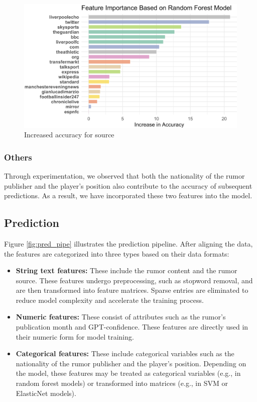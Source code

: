 \begin{figure}[ht]
    \centering
    \includegraphics[width=.8\textwidth]{figs/source_acc.png}
    \caption{
       Increased accuracy for source
    }\label{fig:source_acc}
\end{figure}



\subsubsection{Others}

Through experimentation, we observed that both the nationality of the rumor publisher and the player’s position also contribute to the accuracy of subsequent predictions. As a result, we have incorporated these two features into the model.


\subsection{Prediction}

Figure \ref{fig:pred_pipe} illustrates the prediction pipeline. After aligning the data, the features are categorized into three types based on their data formats:

\begin{itemize} 
    \item \textbf{String text features:} These include the rumor content and the rumor source. These features undergo preprocessing, such as stopword removal, and are then transformed into feature matrices. Sparse entries are eliminated to reduce model complexity and accelerate the training process. 
    \item \textbf{Numeric features:} These consist of attributes such as the rumor’s publication month and GPT-confidence. These features are directly used in their numeric form for model training. 
    \item \textbf{Categorical features:} These include categorical variables such as the nationality of the rumor publisher and the player's position. Depending on the model, these features may be treated as categorical variables (e.g., in random forest models) or transformed into matrices (e.g., in SVM or ElasticNet models).
\end{itemize}


